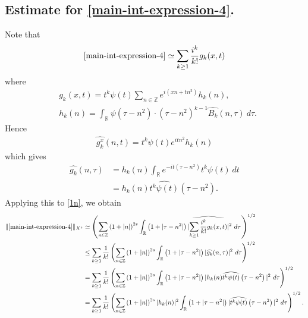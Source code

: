 \documentclass[12pt,reqno]{amsart}
\numberwithin{equation}{section}  %
\numberwithin{figure}{section}
\newcommand{\rr}{\mathbb{R}}
\newcommand{\zz}{\mathbb{Z}}
\newcommand{\wh}{\widehat}
\theoremstyle{plain}
\theoremstyle{definition}
\theoremstyle{remark}
\begin{document}
\subsection{Estimate for \eqref{main-int-expression-4}.}
Note that
%
%
\begin{equation}
  \label{1n}
  \begin{split}
    \eqref{main-int-expression-4} \simeq \sum_{k \ge 1}
    \frac{i^k}{k!}g_k(x,t)
  \end{split}
\end{equation}
%
%
where 
%
%
\begin{equation*}
  \begin{split}
    & g_k(x,t) = t^k \psi(t) \sum_{n \in \zz} e^{i\left( xn + tn^{2}
    \right)} h_k(n),
    \\
    & h_k(n) = \int_\rr \psi \left( \tau - n^{2} \right) \cdot \left(
    \tau - n^{2} \right)^{k -1} \wh{{B_k}}(n, \tau) \ d \tau.
  \end{split}
\end{equation*}
%
%
Hence
%
%
\begin{equation*}
  \begin{split}
    \wh{g_k^x}(n, t) = t^{k} \psi(t) e^{i t n^{2}} h_k(n)
  \end{split}
\end{equation*}
%
%
which gives
%
%
\begin{equation*}
  \begin{split}
    \wh{g_k}(n, \tau)
    & = h_k(n) \int_\rr e^{-it\left( \tau - n^{2} \right)}
    t^{k}\psi(t) \ dt
    \\
    & = h_k(n) \wh{t^{k}\psi(t)} \left( \tau - n^{2} \right).
  \end{split}
\end{equation*}
%
%
Applying this to \eqref{1n}, we obtain
%
%
\begin{equation}
  \label{2n}
  \begin{split}
    \|\eqref{main-int-expression-4}\|_{X^s} 
    & \simeq \left( \sum_{n \in \zz} \left (1 + |n| \right )^{2s} \int_\rr \left( 1 + | \tau -
    n^{2}
    |
    \right) | \wh{\sum_{k \ge 1} \frac{i^k}{k!}g_k(x,t)} |^2 \ d \tau
    \right)^{1/2}
    \\
    & \le \sum_{k \ge 1} \frac{1}{k!}\left( \sum_{n \in \zz} \left (1 + |n| \right )^{2s}
    \int_\rr \left( 1 + | \tau - n^{2} | \right) | \wh{g_k}(n, \tau) |^2 \
    d \tau \right)^{1/2}
    \\
    & = \sum_{k \ge 1} \frac{1}{k!} \left( \sum_{n \in \zz} \left (1 + |n| \right )^{2s}
    \int_\rr \left( 1 + | \tau - n^{2} | \right) | h_k(n) \wh{t^k
    \psi(t)} \left( \tau - n^{2} \right) |^2 \ d \tau \right)^{1/2}
    \\
    & = \sum_{k \ge 1} \frac{1}{k!} \left( \sum_{n \in \zz} \left (1 + |n| \right )^{2s} |
    h_k(n) |^2 \int_\rr \left( 1 + | \tau - n^{2} | \right) | \wh{t^k
    \psi(t)} \left( \tau - n^{2} \right) |^2 \ d \tau \right)^{1/2}.
  \end{split}
\end{equation}
\end{document}
